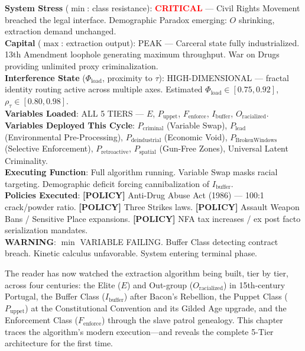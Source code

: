 \documentclass[12pt,openany]{book}
\begin{document}
\begin{tcolorbox}[colback=black!5, colframe=black!70, fonttitle=\bfseries\ttfamily, title=RUNTIME LOG: 1968--PRESENT (NATIONAL)]
\ttfamily\small
\textbf{System Stress} ($\min$: class resistance): \textcolor{red}{\textbf{CRITICAL}} --- Civil Rights Movement breached the legal interface. Demographic Paradox emerging: $O$ shrinking{,} extraction demand unchanged.\\
\textbf{Capital} ($\max$: extraction output): PEAK --- Carceral state fully industrialized. 13th Amendment loophole generating maximum throughput. War on Drugs providing unlimited proxy criminalization.\\
\textbf{Interference State} ($\Phi_{\text{load}}$, proximity to $\tau$): HIGH-DIMENSIONAL --- fractal identity routing active across multiple axes. Estimated $\Phi_{\text{load}} \in [0.75, 0.92]$, $\rho_{\tau} \in [0.80, 0.98]$.\\
\textbf{Variables Loaded}: ALL 5 TIERS --- $E$, $P_{\text{uppet}}$, $F_{\text{enforce}}$, $I_{\text{buffer}}$, $O_{\text{racialized}}$.\\
\textbf{Variables Deployed This Cycle}: $P_{\text{criminal}}$ (Variable Swap), $P_{\text{lead}}$ (Environmental Pre-Processing), $P_{\text{deindustrial}}$ (Economic Void), $P_{\text{BrokenWindows}}$ (Selective Enforcement), $P_{\text{retroactive}}$, $P_{\text{spatial}}$ (Gun-Free Zones), Universal Latent Criminality.\\
\textbf{Executing Function}: Full algorithm running. Variable Swap masks racial targeting. Demographic deficit forcing cannibalization of $I_{\text{buffer}}$.\\
\textbf{Policies Executed}: \textbf{[POLICY]} Anti-Drug Abuse Act (1986) --- 100:1 crack/powder ratio. \textbf{[POLICY]} Three Strikes laws. \textbf{[POLICY]} Assault Weapon Bans / Sensitive Place expansions. \textbf{[POLICY]} NFA tax increases / ex post facto serialization mandates.\\
\textbf{WARNING}: $\min$ VARIABLE FAILING. Buffer Class detecting contract breach. Kinetic calculus unfavorable. System entering terminal phase.
\end{tcolorbox}

\medskip

The reader has now watched the extraction algorithm being built, tier by tier, across four centuries: the Elite ($E$) and Out-group ($O_{\text{racialized}}$) in 15th-century Portugal, the Buffer Class ($I_{\text{buffer}}$) after Bacon's Rebellion, the Puppet Class ($P_{\text{uppet}}$) at the Constitutional Convention and its Gilded Age upgrade, and the Enforcement Class ($F_{\text{enforce}}$) through the slave patrol genealogy. This chapter traces the algorithm's modern execution---and reveals the complete 5-Tier architecture for the first time.
\end{document}
